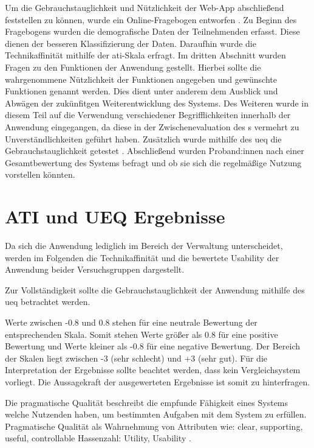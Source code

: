 Um die Gebrauchstauglichkeit und Nützlichkeit der Web-App abschließend
feststellen zu können, wurde ein Online-Fragebogen entworfen . Zu Beginn des Fragebogens wurden die demografische Daten der
Teilnehmenden erfasst. Diese dienen der besseren Klassifizierung der Daten.
Daraufhin wurde die Technikaffinität mithilfe der \ac{ati}-Skala erfragt. Im
dritten Abschnitt wurden Fragen zu den Funktionen der Anwendung gestellt.
Hierbei sollte die wahrgenommene Nützlichkeit der Funktionen angegeben und
gewünschte Funktionen genannt werden. Dies dient unter anderem dem Ausblick und
Abwägen der zukünfitgen Weiterentwicklung des Systems. Des Weiteren wurde in
diesem Teil auf die Verwendung verschiedener Begrifflichkeiten innerhalb der
Anwendung eingegangen, da diese in der Zwischenevaluation des
s vermehrt zu Unverständlichkeiten geführt haben.
Zusätzlich wurde mithilfe des \ac{ueq} die Gebrauchstauglichkeit getestet
\cite{burghardt_mensch_2018}. Abschließend wurden Proband:innen nach einer
Gesamtbewertung des Systems befragt und ob sie sich die regelmäßige Nutzung
vorstellen könnten.



\section{ATI und UEQ Ergebnisse}
Da sich die Anwendung lediglich im Bereich der Verwaltung unterscheidet, werden im
Folgenden die Technikaffinität und die bewertete Usability der Anwendung beider
Versuchsgruppen dargestellt.

Zur Vollständigkeit sollte die Gebrauchstauglichkeit der Anwendung mithilfe des
\ac{ueq} betrachtet werden.

Werte zwischen -0.8 und 0.8 stehen für eine neutrale Bewertung der
entsprechenden Skala. Somit stehen Werte größer als 0.8 für eine positive
Bewertung und Werte kleiner als -0.8 für eine negative Bewertung. Der Bereich
der Skalen liegt zwischen -3 (sehr schlecht) und +3 (sehr gut). Für die
Interpretation der Ergebnisse sollte beachtet werden, dass kein Vergleichsystem
vorliegt. Die Aussagekraft der ausgewerteten Ergebnisse ist somit zu
hinterfragen.


Die pragmatische Qualität beschreibt die empfunde Fähigkeit eines Systems welche
Nutzenden haben, um bestimmten Aufgaben mit dem System zu erfüllen. Pragmatische
Qualität als Wahrnehmung von Attributen wie: clear, supporting, useful,
controllable Hassenzahl: Utility, Usability \cite{hassenzahl_thing_2004}.

